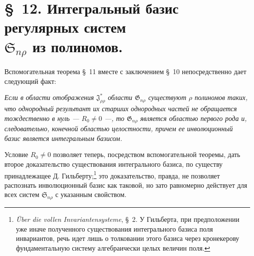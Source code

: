 \documentclass[11pt]{article}
\providecommand{\Ssys}{\mathfrak{S}}
\providecommand{\Jdom}{\mathfrak{J}}
\providecommand{\Gdom}{\mathfrak{G}}
\begin{document}
\section*{\S\ 12. Интегральный базис регулярных систем\\ $\Ssys_{n\rho}$ из полиномов.}

Вспомогательная теорема \S\ 11 вместе с заключением \S\ 10 непосредственно дает следующий факт:

\emph{Если в области отображения $\Jdom^*_{\rho\rho}$ области $\Gdom_{n\rho}$ существуют $\rho$ полиномов таких, что однородный результант их старших однородных частей не обращается тождественно в нуль --- $R_0\ne0$ ---, то $\Gdom_{n\rho}$ является областью первого рода и, следовательно, конечной областью целостности, причем ее инволюционный базис является интегральным базисом.}

Условие $R_0\ne0$ позволяет теперь, посредством вспомогательной теоремы, дать второе доказательство существования интегрального базиса, по существу принадлежащее Д. Гильберту;\footnote{\emph{Über die vollen Invariantensysteme}, \S\ 2. У Гильберта, при предположении уже иначе полученного существования интегрального базиса поля инвариантов, речь идет лишь о толковании этого базиса через кронекерову фундаментальную систему алгебраически целых величин поля.} это доказательство, правда, не позволяет распознать инволюционный базис как таковой, но зато равномерно действует для всех систем $\Ssys_{n\rho}$ с указанным свойством.
\end{document}
